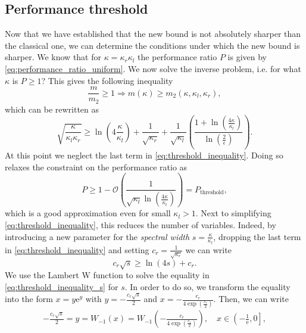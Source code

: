 \subsection{Performance threshold}\label{sec:performance_threshold}
Now that we have established that the new bound is not absolutely sharper than the classical one, we can determine the conditions under which the new bound is sharper. We know that for $\kappa=\kappa_r\kappa_l$ the performance ratio $P$ is given by \cref{eq:performance_ratio_uniform}. We now solve the inverse problem, i.e. for what $\kappa$ is $P \geq 1$? This gives the following inequality
\[
    \frac{m}{m_2} \geq 1 \Rightarrow m(\kappa) \geq m_2(\kappa, \kappa_l, \kappa_r),
\]
which can be rewritten as
\begin{equation}
    \sqrt{\frac{\kappa}{\kappa_l\kappa_r}} \geq \ln\left(4\frac{\kappa}{\kappa_l}\right) + \frac{1}{\sqrt{\kappa_r}} + \frac{1}{\sqrt{\kappa_l}}\left(\frac{1 + \ln\left(\frac{4\kappa}{\kappa_l}\right)}{\ln\left(\frac{2}{\epsilon}\right)}\right).
    \label{eq:threshold_inequality}
\end{equation}
At this point we neglect the last term in \cref{eq:threshold_inequality}. Doing so relaxes the constraint on the performance ratio as
\begin{equation}
    P \geq 1 - \mathcal{O}\left(\frac{1}{\sqrt{\kappa_l}\ln\left(\frac{4\kappa}{\kappa_l}\right)}\right) = P_{\text{threshold}},
    \label{eq:approximate_performance_ratio_threshold}
\end{equation}
which is a good approximation even for small $\kappa_l> 1$. Next to simplifying \cref{eq:threshold_inequality}, this reduces the number of variables. Indeed, by introducing a new parameter for the \textit{spectral width} $s = \frac{\kappa}{\kappa_l}$, dropping the last term in \cref{eq:threshold_inequality} and setting $c_r = \frac{1}{\sqrt{\kappa_r}}$ we can write
\begin{equation}
    c_r\sqrt{s} \geq \ln\left(4s\right) + c_r.
    \label{eq:threshold_inequality_s}
\end{equation}
We use the Lambert $\mathrm{W}$ function to solve the equality in \cref{eq:threshold_inequality_s} for $s$. In order to do so, we transform the equality into the form $x = y \mathrm{e}^y$ with $y = -\frac{c_r\sqrt{s}}{2}$ and $x = -\frac{c_r}{4\exp\left(\frac{c_r}{2}\right)}$. Then, we can write
\begin{align*}
    -\frac{c_r\sqrt{s}}{2} = y = W_{-1}(x) = W_{-1}\left(-\frac{c_r}{4\exp\left(\frac{c_r}{2}\right)}\right), \quad x \in \left(-\frac{1}{\mathrm{e}}, 0 \right],
\end{align*}
